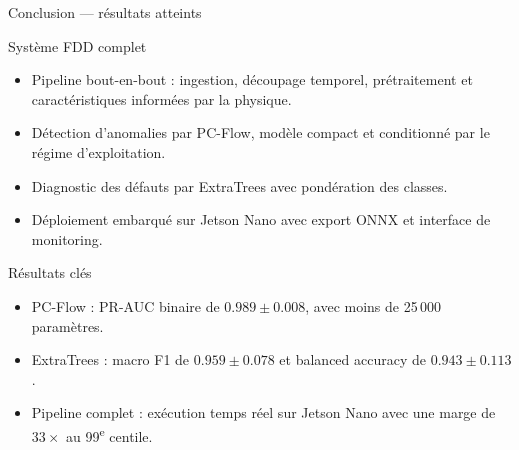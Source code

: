 \documentclass[10pt,aspectratio=169]{beamer}
\begin{document}
\begin{frame}{Conclusion --- résultats atteints}

\small

\begin{block}{Système FDD complet}
\begin{itemize}
  \item Pipeline bout-en-bout : ingestion, découpage temporel, prétraitement et caractéristiques informées par la physique.
  \item Détection d'anomalies par PC-Flow, modèle compact et conditionné par le régime d'exploitation.
  \item Diagnostic des défauts par ExtraTrees avec pondération des classes.
  \item Déploiement embarqué sur Jetson Nano avec export ONNX et interface de monitoring.
\end{itemize}
\end{block}

\vspace{0.15cm}

\begin{block}{Résultats clés}
\begin{itemize}
  \item PC-Flow : PR-AUC binaire de \(0.989 \pm 0.008\), avec moins de 25\,000 paramètres.
  \item ExtraTrees : macro F1 de \(0.959 \pm 0.078\) et balanced accuracy de \(0.943 \pm 0.113\).
  \item Pipeline complet : exécution temps réel sur Jetson Nano avec une marge de \(33\times\) au 99\textsuperscript{e} centile.
\end{itemize}
\end{block}

\end{frame}
\end{document}
